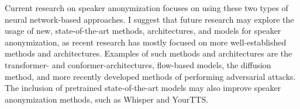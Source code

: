 \documentclass{Interspeech2024}
\begin{document}
Current research on speaker anonymization focuses on using these two types of neural network-based approaches.
I suggest that future research may explore the usage of new, state-of-the-art methods, architectures, and models for speaker anonymization, as recent research has mostly focused on more well-established methods and architectures.
Examples of such methods and architectures are the transformer- and conformer-architectures, flow-based models, the diffusion method, and more recently developed methods of performing adversarial attacks.
The inclusion of pretrained state-of-the-art models may also improve speaker anonymization methods, such as Whisper and YourTTS.



\end{document}
